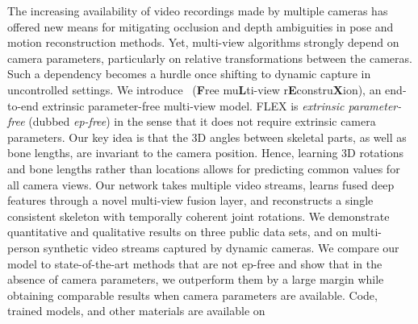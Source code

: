 \begin{myabstract}
The increasing availability of video recordings made by multiple cameras has offered new means for mitigating occlusion and depth ambiguities in pose and motion reconstruction methods. Yet,  multi-view algorithms strongly depend on camera parameters, particularly on relative transformations between the cameras. 
Such a dependency becomes a hurdle once shifting to dynamic capture in uncontrolled settings. 
We introduce \algoname \, (\textbf{F}ree mu\textbf{L}ti-view r\textbf{E}constru\textbf{X}ion), an end-to-end extrinsic parameter-free multi-view model. FLEX is \emph{extrinsic parameter-free} (dubbed \emph{ep-free}) in the sense that it does not require extrinsic camera parameters. 
Our key idea is that the 3D angles between skeletal parts, as well as bone lengths, are invariant to the camera position. 
%
Hence, learning 3D rotations and bone lengths rather than locations allows for predicting common values for all camera views. 
%
Our network takes multiple video streams, learns fused deep features through a novel multi-view fusion layer,
and reconstructs a single consistent skeleton with temporally coherent joint rotations.
%
We demonstrate quantitative and qualitative results on three public data sets, and on multi-person synthetic video streams captured by dynamic cameras.
%
We compare our model to state-of-the-art methods that are not ep-free and show that in the absence of camera parameters, we outperform them by a large margin while obtaining comparable results when camera parameters are available.
Code, trained models, and other materials are available on \fi

\ifeccv
{}
\fi

\end{myabstract}

